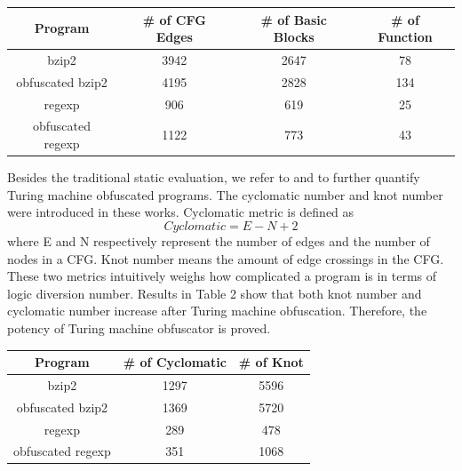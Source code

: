 \documentclass[lnicst]{svmultln}
\begin{document}
\begin{center}
 
 \begin{tabular}{|c | c | c | c|}
 \hline 
 Program & \# of CFG Edges & \# of Basic Blocks & \# of Function \\
 \hline
bzip2 & 3942 & 2647 & 78 \\ 
 \hline
obfuscated bzip2 & 4195 & 2828 & 134 \\
 \hline
regexp & 906 & 619 & 25 \\ 
 \hline
obfuscated regexp & 1122 & 773 & 43 \\
 \hline
\end{tabular}
\end{center}

Besides the traditional static evaluation, we refer to \cite{McCabe} and \cite{Woodward} to further quantify Turing machine obfuscated programs. The cyclomatic number and knot number were introduced in these works. Cyclomatic metric is defined as \[ Cyclomatic = E - N + 2 \] where E and N respectively represent the number of edges and the number of nodes in a CFG. Knot number means the amount of edge crossings in the CFG. These two metrics intuitively weighs how complicated a program is in terms of logic diversion number. Results in Table 2 show that both knot number and cyclomatic number increase after Turing machine obfuscation. Therefore, the potency of Turing machine obfuscator is proved.

\begin{center}
 \begin{tabular}{|c | c | c |} 
 \hline 
 Program & \# of Cyclomatic & \# of Knot \\
 \hline
bzip2 & 1297 & 5596  \\ 
 \hline
obfuscated bzip2 & 1369 & 5720  \\
 \hline
regexp & 289 & 478 \\ 
 \hline
obfuscated regexp & 351 & 1068 \\
 \hline
\end{tabular}
\end{center}
\end{document}
